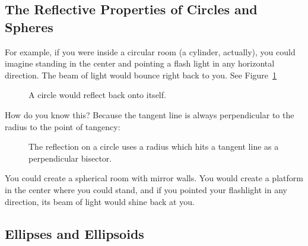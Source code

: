 \subsection{The Reflective Properties of Circles and Spheres}

For example, if you were inside a circular room (a cylinder,
actually), you could imagine standing in the center and pointing a
flash light in any horizontal direction. The beam of light would
bounce right back to you. See Figure~\ref{fig:circlReflection}

\begin{figure}[htbp]
    \centering
    \caption{A circle would reflect back onto itself.}
    \label{fig:circlReflection}
\end{figure}

How do you know this?  Because the tangent line is always perpendicular to the radius to the point of tangency:
\begin{figure}[htbp]
    \centering
    \caption{The reflection on a circle uses a radius which hits a tangent line as a perpendicular bisector.}
    \label{fig:tangentCircle}
\end{figure}

You could create a spherical room with mirror walls. You would
create a platform in the center where you could stand, and if you
pointed your flashlight in any direction, its beam of light would
shine back at you.

\subsection{Ellipses and Ellipsoids}

